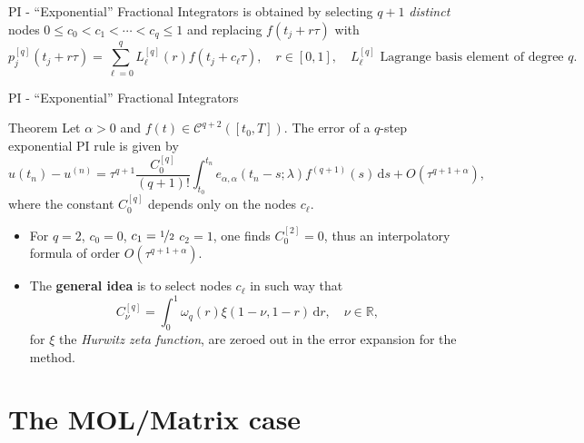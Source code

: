 \documentclass[aspectratio=169,xcolor=dvipsnames]{beamer}
\begin{document}
\begin{frame}{PI - ``Exponential'' Fractional Integrators}
%
is obtained by selecting $q+1$ \emph{distinct} nodes $0 \leq c_0 < c_1 < \cdots < c_q \leq 1$ and replacing $f(t_j + r\tau)$ with
\[
p_j^{[q]}(t_j + r \tau) = \sum_{\ell=0}^{q} L_\ell^{[q]}(r) f(t_j + c_\ell \tau), \quad r \in [0,1], \quad L_\ell^{[q]} \text{ Lagrange basis element of degree }q.
\]
\end{frame}

\begin{frame}{PI - ``Exponential'' Fractional Integrators}

\begin{alertblock}{Theorem \parencite[Theorem 4.2]{GarrappaPopolizioPIExponential}}
Let $\alpha > 0$ and $f(t) \in \mathcal{C}^{q+2}([t_0,T])$. The error of a $q$-step exponential PI rule is given by
\[
u(t_n) - u^{(n)} = \tau^{q+1} \frac{C_0^{[q]}}{(q+1)!} \int_{t_0}^{t_n} e_{\alpha,\alpha}(t_n-s;\lambda) f^{(q+1)}(s)\,\textrm{d}s + O(\tau^{q+1+\alpha}),
\]
where the constant $C_0^{[q]}$ depends only on the nodes $c_\ell$.
\end{alertblock}

\begin{itemize}
	\item For $q = 2$, $c_0 = 0$, $c_1 = \nicefrac{1}{2}$ $c_2 = 1$, one finds $C^{[2]}_0 = 0$, thus an interpolatory formula of order $O(\tau^{q+1+\alpha})$. 
	\item[\faLightbulb] The \textbf{general idea} is to select nodes $c_\ell$ in such way that 
	\[
	C_\nu^{[q]} = \int_{0}^{1} \omega_q(r) \xi(1-\nu,1-r)\,\textrm{d}r, \quad \nu \in \mathbb{R},
	\]
	for $\xi$ the \emph{Hurwitz zeta function}, are zeroed out in the error expansion for the method.
\end{itemize}

\end{frame}

\section{The MOL/Matrix case}
\end{document}
